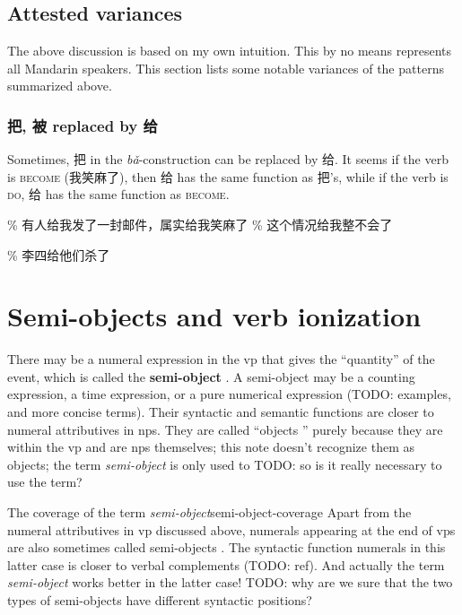 \documentclass[UTF8, a4paper, oneside, scheme=plain, 12pt]{ctexrep}
\newcommand*{\citesec}[1]{\S~{#1}}
\newcommand*{\citepage}[1]{p.~{#1}}
\newcommand*{\concept}[1]{\textbf{#1}}
\newcommand*{\term}[1]{\emph{#1}}
\newcommand{\form}[1]{\emph{#1}}
\newcommand*{\category}[1]{\textsc{#1}}
\begin{document}
\subsection{Attested variances}

The above discussion is based on my own intuition.
This by no means represents all Mandarin speakers. 
This section lists some notable variances of the patterns summarized above. 

\subsubsection{把, 被 replaced by 给}

Sometimes, 把 in the \form{bǎ}-construction can be replaced by 给.
It seems if the verb is \category{become} (我笑麻了),
then 给 has the same function as 把's, 
while if the verb is \category{do},
给 has the same function as \category{become}.

\begin{exe}
    \ex \% 有人给我发了一封邮件，属实给我笑麻了
    \ex \% 这个情况给我整不会了
\end{exe}

\begin{exe}
    \ex\label{ex:verb-phrase.gei.2} \% 李四给他们杀了
\end{exe}


\section{Semi-objects and verb ionization}\label{sec:verb-splitting}

There may be a numeral expression in the \acs{vp}
that gives the ``quantity'' of the event, 
which is called the \concept{semi-object} 
\citep[\citesec{8.6}]{zhudexigrammar}.
A semi-object may be a counting expression, 
a time expression, 
or a pure numerical expression (TODO: examples, and more concise terms).
Their syntactic and semantic functions 
are closer to numeral attributives in \acs{np}s.
They are called ``objects '' purely because they are within the \acs{vp}
and are \acs{np}s themselves;
this note doesn't recognize them as objects;
the term \term{semi-object} is only used to TODO: so is it really necessary to use the term?

\begin{infobox}{The coverage of the term \term{semi-object}}{semi-object-coverage}
    Apart from the numeral attributives in \acs{vp} discussed above, 
    numerals appearing at the end of \acs{vp}s 
    are also sometimes called semi-objects \citep[\citepage{117}]{deng2010formal}.
    The syntactic function numerals in this latter case 
    is closer to verbal complements (TODO: ref).
    And actually the term \term{semi-object} works better in the latter case!
    TODO: why are we sure that the two types of semi-objects have different syntactic positions?
\end{infobox}
\end{document}
